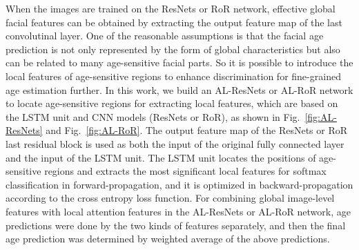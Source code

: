 \documentclass[journal]{IEEEtran}
\begin{document}
When the images are trained on the ResNets or RoR network, effective global facial features can be obtained by extracting the output feature map of the last convolutinal layer. One of the reasonable assumptions is that the facial age prediction is not only represented by the form of global characteristics but also can be related to many age-sensitive facial parts. So it is possible to introduce the local features of age-sensitive regions to enhance discrimination for fine-grained age estimation further. In this work, we build an AL-ResNets or AL-RoR network to locate age-sensitive regions for extracting local features, which are based on the LSTM unit and CNN models (ResNets or RoR), as shown in Fig.~\ref{fig:AL-ResNets} and Fig.~\ref{fig:AL-RoR}. The output feature map of the ResNets or RoR last residual block is used as both the input of the original fully connected layer and the input of the LSTM unit. The LSTM unit locates the positions of age-sensitive regions and extracts the most significant local features for softmax classification in forward-propagation, and it is optimized in backward-propagation according to the cross entropy loss function. For combining global image-level features with local attention features in the AL-ResNets or AL-RoR network, age predictions were done by the two kinds of features separately, and then the final age prediction was determined by weighted average of the above predictions.
\end{document}

